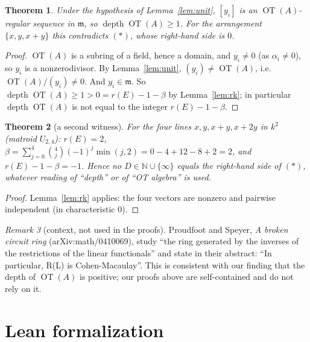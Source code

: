 \documentclass[11pt]{article}
\newtheorem{theorem}{Theorem}
\theoremstyle{definition}
\theoremstyle{remark}
\newtheorem{remark}[theorem]{Remark}
\newcommand{\OT}{\operatorname{OT}}
\newcommand{\rk}{r}
\newcommand{\depth}{\operatorname{depth}}
\begin{document}
\begin{theorem}\label{thm:main}
Under the hypothesis of Lemma~\ref{lem:unit}, $[y_i]$ is an $\OT(A)$-regular sequence in
$\mathfrak{m}$, so $\depth\OT(A)\ge 1$. For the arrangement $\{x,y,x+y\}$ this contradicts
$(\ast)$, whose right-hand side is $0$.
\end{theorem}

\begin{proof}
$\OT(A)$ is a subring of a field, hence a domain, and $y_i\neq0$ (as $\alpha_i\neq 0$), so $y_i$
is a nonzerodivisor. By Lemma~\ref{lem:unit}, $(y_i)\neq\OT(A)$, i.e.\ $\OT(A)/(y_i)\neq 0$. And
$y_i\in\mathfrak{m}$. So $\depth\OT(A)\ge 1>0=\rk(E)-1-\beta$ by Lemma~\ref{lem:rk}; in
particular $\depth\OT(A)$ is not equal to the integer $\rk(E)-1-\beta$.
\end{proof}

\begin{theorem}[a second witness]\label{thm:u24}
For the four lines $x,y,x+y,x+2y$ in $k^2$ (matroid $U_{2,4}$): $\rk(E)=2$,
$\beta=\sum_{j=0}^4\binom4j(-1)^j\min(j,2)=0-4+12-8+2=2$, and $\rk(E)-1-\beta=-1$. Hence no
$D\in\mathbb{N}\cup\{\infty\}$ equals the right-hand side of $(\ast)$, whatever reading of
``depth'' or of ``OT algebra'' is used.
\end{theorem}

\begin{proof}
Lemma~\ref{lem:rk} applies: the four vectors are nonzero and pairwise independent (in
characteristic $0$).
\end{proof}

\begin{remark}[context, not used in the proofs]
Proudfoot and Speyer, \emph{A broken circuit ring} (arXiv:math/0410069), study ``the ring
generated by the inverses of the restrictions of the linear functionals'' and state in their
abstract: ``In particular, R(L) is Cohen-Macaulay''. This is consistent with our finding that the
depth of $\OT(A)$ is positive; our proofs above are self-contained and do not rely on it.
\end{remark}

\section{Lean formalization}
\end{document}
